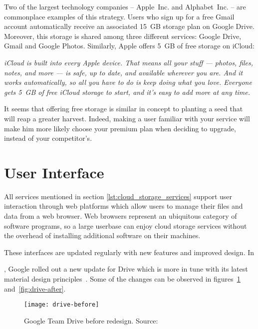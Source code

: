 Two of the largest technology companies -- \mbox{Apple Inc.} and \mbox{Alphabet Inc.} -- are commonplace examples of this strategy. Users who sign up for a free Gmail account automatically receive an associated \mbox{15 GB} storage plan on Google Drive. Moreover, this storage is shared among three different services: Google Drive, Gmail and Google Photos. Similarly, Apple offers \mbox{5 GB} of free storage on iCloud:

\begin{quoting}[vskip=0pt]
\emph{iCloud is built into every Apple device. That means all your stuff — photos, files, notes, and more — is safe, up to date, and available wherever you are. And it works automatically, so all you have to do is keep doing what you love. Everyone gets \mbox{5 GB} of free iCloud storage to start, and it’s easy to add more at any time.}~\cite{icloud_website}
\end{quoting}

It seems that offering free storage is similar in concept to planting a seed that will reap a greater harvest. Indeed, making a user familiar with your service will make him more likely choose your premium plan when deciding to upgrade, instead of your competitor's.

\section{User Interface}

All services mentioned in section \ref{lst:cloud_storage_services} support user interaction through web platforms which allow users to manage their files and data from a web browser. Web browsers represent an ubiquitous category of software programs, so a large userbase can enjoy cloud storage services without the overhead of installing additional software on their machines.

These interfaces are updated regularly with new features and improved design. In \date{May 2018}, Google rolled out a new update for Drive which is more in tune with its latest material design principles~\cite{google_drive_ui_updates,how_google_created_a_custom_material_theme}. Some of the changes can be observed in figures~\ref{fig:drive-before} and~\ref{fig:drive-after}.

\begin{figure}[bpt]
\caption{Google Team Drive before redesign. Source:~\cite{google_drive_ui_updates}}
\label{fig:drive-before}
\centering
\texttt{[image: drive-before]}
\end{figure}

